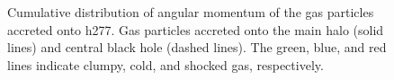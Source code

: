 \documentclass[manuscript]{aastex}
\begin{document}
\begin{figure}
\centerline{}
\caption[]{ Cumulative distribution of angular momentum of the gas particles accreted onto h277.  Gas particles accreted onto the main halo (solid lines) and central black hole (dashed lines). The green, blue, and red lines indicate clumpy, cold, and shocked gas, respectively.}
\label{h277angmom} 
\end{figure}



\end{document}
